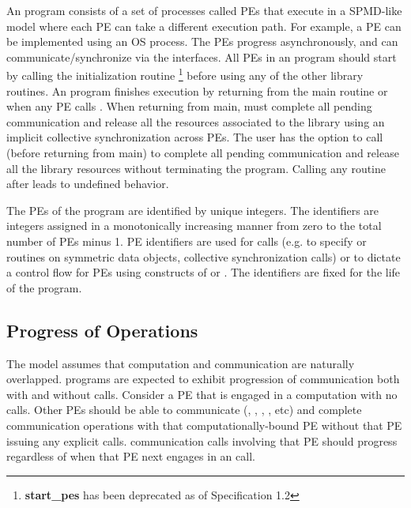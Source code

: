 An \openshmem program consists of a set of \openshmem processes called \ac{PE}s
that execute in a \ac{SPMD}-like model where each \ac{PE} can take a different
execution path. For example, a \ac{PE} can be implemented using an OS
process.  The \ac{PE}s progress asynchronously, and can communicate/synchronize
via the \openshmem interfaces.  All \ac{PE}s in an \openshmem program should
start by calling the initialization routine  
\footnote{\textbf{start\_pes} has been deprecated as of Specification 1.2}
before using any of the other \openshmem library routines.  An \openshmem
program finishes execution by returning from the main routine or when any PE
calls . When returning from main, \openshmem must
complete all pending communication and release all the resources associated to
the library using an implicit collective synchronization across PEs. The user
has the option to call  (before returning from main) to
complete all pending communication and release all the \openshmem library
resources without terminating the program. Calling any \openshmem routine after
 leads to undefined behavior.

The \ac{PE}s of the \openshmem program are identified by unique integers.  The
identifiers are integers assigned in a monotonically increasing manner from zero
to the total number of \ac{PE}s minus 1. \ac{PE} identifiers are used for
\openshmem calls (e.g. to specify  or  routines on symmetric
data objects, collective synchronization calls) or to dictate a control flow for
\ac{PE}s using constructs of \Clang{} or \Fortran. The identifiers are fixed for
the life of the \openshmem program.

\subsection{Progress of \openshmem Operations}\label{subsec:progress}

The \openshmem model assumes that computation and communication are naturally
overlapped. \openshmem programs are expected to exhibit progression of
communication both with and without \openshmem calls. Consider a \ac{PE} that is
engaged in a computation with no \openshmem calls. Other \ac{PE}s should be able
to communicate (, , , , etc) and
complete communication operations with that computationally-bound \ac{PE}
without that \ac{PE} issuing any explicit \openshmem calls. \openshmem
communication calls involving that \ac{PE} should progress regardless of when
that \ac{PE} next engages in an \openshmem call.

